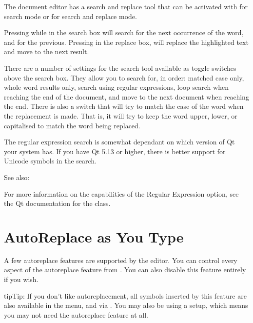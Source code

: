 \documentclass[a4paper,11pt,english]{sphinxmanual}
\begin{document}
\sphinxAtStartPar
The document editor has a search and replace tool that can be activated with  for
search mode or  for search and replace mode.

\sphinxAtStartPar
Pressing  while in the search box will search for the next occurrence of the word, and
 for the previous. Pressing  in the replace box, will replace the
highlighted text and move to the next result.

\sphinxAtStartPar
There are a number of settings for the search tool available as toggle switches above the search
box. They allow you to search for, in order: matched case only, whole word results only, search
using regular expressions, loop search when reaching the end of the document, and move to the next
document when reaching the end. There is also a switch that will try to match the case of the word
when the replacement is made. That is, it will try to keep the word upper, lower, or capitalised to
match the word being replaced.

\sphinxAtStartPar
The regular expression search is somewhat dependant on which version of Qt your system has. If you
have Qt 5.13 or higher, there is better support for Unicode symbols in the search.


\begin{sphinxseealso}{See also:}

\sphinxAtStartPar
For more information on the capabilities of the Regular Expression option, see the Qt
documentation for the 
class.


\end{sphinxseealso}



\section{Auto\sphinxhyphen{}Replace as You Type}
\label{\detokenize{usage_writing:auto-replace-as-you-type}}\label{\detokenize{usage_writing:a-ui-edit-auto}}
\sphinxAtStartPar
A few auto\sphinxhyphen{}replace features are supported by the editor. You can control every aspect of the
auto\sphinxhyphen{}replace feature from . You can also disable this feature entirely if you wish.

\begin{sphinxadmonition}{tip}{Tip:}
\sphinxAtStartPar
If you don’t like auto\sphinxhyphen{}replacement, all symbols inserted by this feature are also available in
the  menu, and via {\hyperref[\detokenize{usage_shortcuts:a-kb-ins}]{}}. You may also be using a 
setup, which means you may not need the auto\sphinxhyphen{}replace feature at all.
\end{sphinxadmonition}
\end{document}
